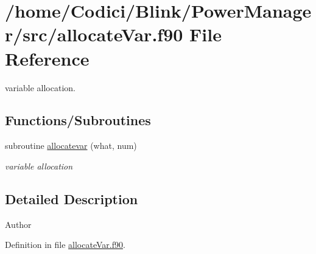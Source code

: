 \hypertarget{allocate_var_8f90}{\section{/home/\-Codici/\-Blink/\-Power\-Manager/src/allocate\-Var.f90 File Reference}
\label{allocate_var_8f90}
}


variable allocation.  


\subsection*{Functions/\-Subroutines}
\begin{DoxyCompactItemize}
\item 
subroutine \hyperlink{allocate_var_8f90_ab05eb79f2192fe599c8b251796a49963}{allocatevar} (what, num)
\begin{DoxyCompactList}\small\item\em variable allocation \end{DoxyCompactList}\end{DoxyCompactItemize}


\subsection{Detailed Description}
\begin{DoxyAuthor}{Author}

\end{DoxyAuthor}


Definition in file \hyperlink{allocate_var_8f90_source}{allocate\-Var.\-f90}.



